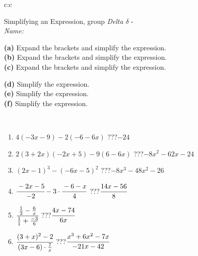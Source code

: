 \documentclass[10pt]{report}
\begin{document}
\newpage
\thispagestyle{empty}
\begin{tabular}{c:c}
\begin{minipage}[c][104.5mm][t]{0.5\linewidth}
\begin{center}
\vspace{7mm}
{\huge Simplifying an Expression, group \textit{Delta $\delta$} -}\\[5mm]
\textit{Name:}\phantom{xxxxxxxxxxxxxxxxxxxxxxxxxxxxxxxxxxxxxxxxxxxxxxxxxxxxxxxxxxxxxxxxx}\\[5mm]
\begin{minipage}{0.95\linewidth}
\begin{center}
{\small \begin{minipage}{0.6\textwidth}
\textbf{(a)} Expand the brackets and simplify the expression. \\[1mm]
\textbf{(b)} Expand the brackets and simplify the expression. \\[1mm]
\textbf{(c)} Expand the brackets and simplify the expression.
\end{minipage} \begin{minipage}{0.39\textwidth}
\textbf{(d)} Simplify the expression. \\[1mm]
\textbf{(e)} Simplify the expression. \\[1mm]
\textbf{(f)} Simplify the expression.
\end{minipage}
}
\end{center}
\end{minipage}
\\[4mm]
\begin{minipage}{0.79\linewidth}
\begin{center}
\begin{varwidth}{\linewidth}
\begin{enumerate}
\normalsize
\item $4(-3x-9)-2(-6-6x)$\quad \dotfill\; ???\;\dotfill \quad $-24$
\item $2(3+2x)(-2x+5)-9(6-6x)$\quad \dotfill\; ???\;\dotfill \quad $-8x^2-62x-24$
\item $(2x-1)^3-(-6x-5)^2$\quad \dotfill\; ???\;\dotfill \quad $-8x^3-48x^2-26$
\item $\cfrac{-2x-5}{-2}-3\cdot\cfrac{-6-x}{4}$\quad \dotfill\; ???\;\dotfill \quad $\cfrac{14x-56}{8}$
\item $\cfrac{\frac{1}{2}-\frac{6}{x}}{\frac{1}{1}+\frac{-3}{6}}$\quad \dotfill\; ???\;\dotfill \quad $\cfrac{4x-74}{6x}$
\item $\cfrac{(3+x)^2-2}{(3x-6)\cdot\frac{7}{x}}$\quad \dotfill\; ???\;\dotfill \quad $\cfrac{x^3+6x^2-7x}{-21x-42}$

\end{enumerate}
\end{varwidth}
\end{center}
\end{minipage}
\end{center}
\end{minipage}
\end{tabular}
\end{document}
